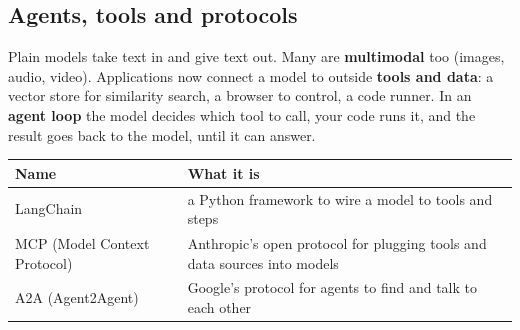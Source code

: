 \subsection{Agents, tools and protocols}

Plain models take text in and give text out. Many are \textbf{multimodal} too (images, audio,
video). Applications now connect a model to outside \textbf{tools and data}: a vector store for
similarity search, a browser to control, a code runner. In an \textbf{agent loop} the model decides
which tool to call, your code runs it, and the result goes back to the model, until it can answer.

\begin{center}
\end{center}

\begin{center}
\begin{tabularx}{\linewidth}{@{}l X@{}}
\toprule
\textbf{Name} & \textbf{What it is} \\
\midrule
LangChain & a Python framework to wire a model to tools and steps \\
MCP (Model Context Protocol) & Anthropic's open protocol for plugging tools and data sources into models \\
A2A (Agent2Agent) & Google's protocol for agents to find and talk to each other \\
\bottomrule
\end{tabularx}
\end{center}

